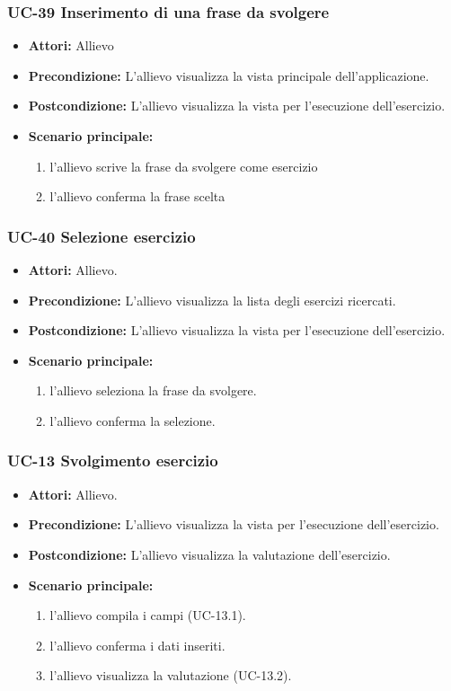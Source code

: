 	\subsubsection{UC-39 Inserimento di una frase da svolgere}
	\begin{itemize}
		\item \textbf{Attori:} Allievo
		\item \textbf{Precondizione:} L'allievo visualizza la vista principale dell'applicazione.
		\item \textbf{Postcondizione:} L'allievo visualizza la vista per l'esecuzione dell'esercizio.
		\item \textbf{Scenario principale:}
		\begin{enumerate}
			\item l'allievo scrive la frase da svolgere come esercizio
			\item l'allievo conferma la frase scelta
		\end{enumerate}
	\end{itemize}

	\subsubsection{UC-40 Selezione esercizio}
	\begin{itemize}
			\item \textbf{Attori:} Allievo.
			\item \textbf{Precondizione:} L'allievo visualizza la lista degli esercizi ricercati.
			\item \textbf{Postcondizione:} L'allievo visualizza la vista per l'esecuzione dell'esercizio.
			\item \textbf{Scenario principale:}
			\begin{enumerate}
					\item l'allievo seleziona la frase da svolgere.
					\item l'allievo conferma la selezione.
			\end{enumerate}
	\end{itemize}

	\subsubsection{UC-13 Svolgimento esercizio}
	\begin{itemize}
			\item \textbf{Attori:} Allievo.
			\item \textbf{Precondizione:}  L'allievo visualizza la vista per l'esecuzione dell'esercizio.
			\item \textbf{Postcondizione:} L'allievo visualizza la valutazione dell'esercizio.
			\item \textbf{Scenario principale:}
			\begin{enumerate}
				\item l'allievo compila i campi (UC-13.1).
				\item l'allievo conferma i dati inseriti.
				\item l'allievo visualizza la valutazione (UC-13.2).
			\end{enumerate}
	\end{itemize}
			
